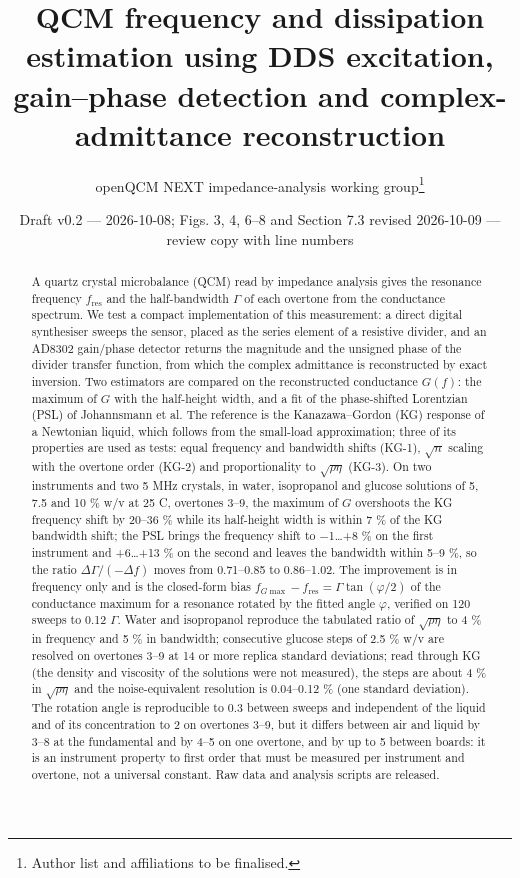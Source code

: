 \documentclass[11pt,a4paper]{article}
\title{QCM frequency and dissipation estimation using DDS excitation, gain--phase detection and complex-admittance reconstruction}
\author{openQCM NEXT impedance-analysis working group\thanks{Author list and affiliations to be finalised.}}
\date{Draft v0.2 --- 2026-10-08; Figs. 3, 4, 6--8 and Section 7.3 revised 2026-10-09 --- review copy with line numbers}
\begin{document}
\linenumbers
\maketitle
\begin{abstract}
A quartz crystal microbalance (QCM) read by impedance analysis gives the resonance frequency $f_\mathrm{res}$ and the half-bandwidth $\Gamma$ of each overtone from the conductance spectrum. We test a compact implementation of this measurement: a direct digital synthesiser sweeps the sensor, placed as the series element of a resistive divider, and an AD8302 gain/phase detector returns the magnitude and the unsigned phase of the divider transfer function, from which the complex admittance is reconstructed by exact inversion. Two estimators are compared on the reconstructed conductance $G(f)$: the maximum of $G$ with the half-height width, and a fit of the phase-shifted Lorentzian (PSL) of Johannsmann et al. The reference is the Kanazawa--Gordon (KG) response of a Newtonian liquid, which follows from the small-load approximation; three of its properties are used as tests: equal frequency and bandwidth shifts (KG-1), $\sqrt n$ scaling with the overtone order (KG-2) and proportionality to $\sqrt{\rho\eta}$ (KG-3). On two instruments and two 5 MHz crystals, in water, isopropanol and glucose solutions of 5, 7.5 and 10 \% w/v at 25 \textdegree{}C, overtones 3--9, the maximum of $G$ overshoots the KG frequency shift by 20--36 \% while its half-height width is within 7 \% of the KG bandwidth shift; the PSL brings the frequency shift to $-$1\ldots{}+8 \% on the first instrument and +6\ldots{}+13 \% on the second and leaves the bandwidth within 5--9 \%, so the ratio $\Delta\Gamma/(-\Delta f)$ moves from 0.71--0.85 to 0.86--1.02. The improvement is in frequency only and is the closed-form bias $f_{G\max} - f_\mathrm{res} = \Gamma\tan(\varphi/2)$ of the conductance maximum for a resonance rotated by the fitted angle $\varphi$, verified on 120 sweeps to 0.12 $\Gamma$. Water and isopropanol reproduce the tabulated ratio of $\sqrt{\rho\eta}$ to 4 \% in frequency and 5 \% in bandwidth; consecutive glucose steps of 2.5 \% w/v are resolved on overtones 3--9 at 14 or more replica standard deviations; read through KG (the density and viscosity of the solutions were not measured), the steps are about 4 \% in $\sqrt{\rho\eta}$ and the noise-equivalent resolution is 0.04--0.12 \% (one standard deviation). The rotation angle is reproducible to 0.3\textdegree{} between sweeps and independent of the liquid and of its concentration to 2\textdegree{} on overtones 3--9, but it differs between air and liquid by 3--8\textdegree{} at the fundamental and by 4--5\textdegree{} on one overtone, and by up to 5\textdegree{} between boards: it is an instrument property to first order that must be measured per instrument and overtone, not a universal constant. Raw data and analysis scripts are released.
\end{abstract}
\end{document}
